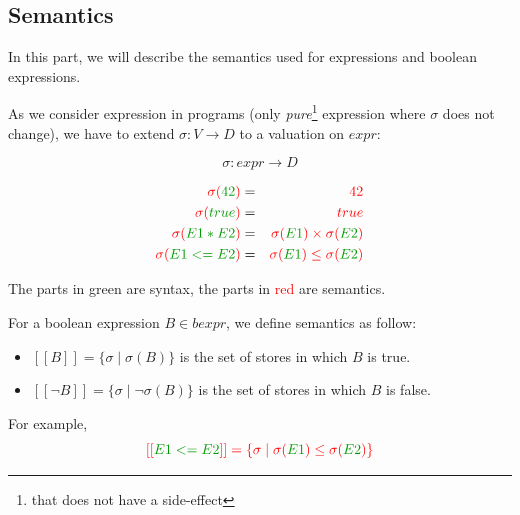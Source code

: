 \documentclass[12pt, a4paper]{book}
\begin{document}
\subsection{Semantics}
\label{sub:Semantics}

In this part, we will describe the semantics used for expressions and boolean
expressions. \newline

As we consider expression in programs (only \textit{pure}\footnote{that does
not have a side-effect} expression where $\sigma$ does not change), we have to
extend $\sigma : V \rightarrow D$ to a valuation on $expr$:

$$
\sigma : expr \rightarrow D
$$

\begin{eqnarray}
    \textcolor{red}{\sigma(}\textcolor{green!60!black}{42}\textcolor{red}{)} & = & \textcolor{red}{42} \\
    \textcolor{red}{\sigma(}\textcolor{green!60!black}{true}\textcolor{red}{)} & = & \textcolor{red}{true} \\
    \textcolor{red}{\sigma(}\textcolor{green!60!black}{E1*E2}\textcolor{red}{)} & = & \textcolor{red}{\sigma(}\textcolor{green!60!black}{E1}\textcolor{red}{) \times \sigma(}\textcolor{green!60!black}{E2}\textcolor{red}{)} \\
    \textcolor{red}{\sigma(}\textcolor{green!60!black}{E1<=E2}\textcolor{red}{)} & = & \textcolor{red}{\sigma(}\textcolor{green!60!black}{E1}\textcolor{red}{) \le \sigma(}\textcolor{green!60!black}{E2}\textcolor{red}{)}
\end{eqnarray}

The parts in \textcolor{green!60!black}{green} are syntax, the parts in
\textcolor{red}{red} are semantics. \newline

For a boolean expression $B \in bexpr$, we define semantics as follow:

\begin{itemize}
    \item $[[B]] = \{\sigma \mid \sigma(B)\}$ is the set of stores in which $B$
    is true.
    \item $[[\lnot B]] = \{\sigma \mid \lnot \sigma(B)\}$ is the set of stores
    in which $B$ is false.
\end{itemize}

For example,
$$
\textcolor{red}{[[}\textcolor{green!60!black}{E1<=E2}\textcolor{red}{]] = \{\sigma \mid \sigma(}\textcolor{green!60!black}{E1}\textcolor{red}{) \le \sigma(}\textcolor{green!60!black}{E2}\textcolor{red}{)\}}
$$
\end{document}

